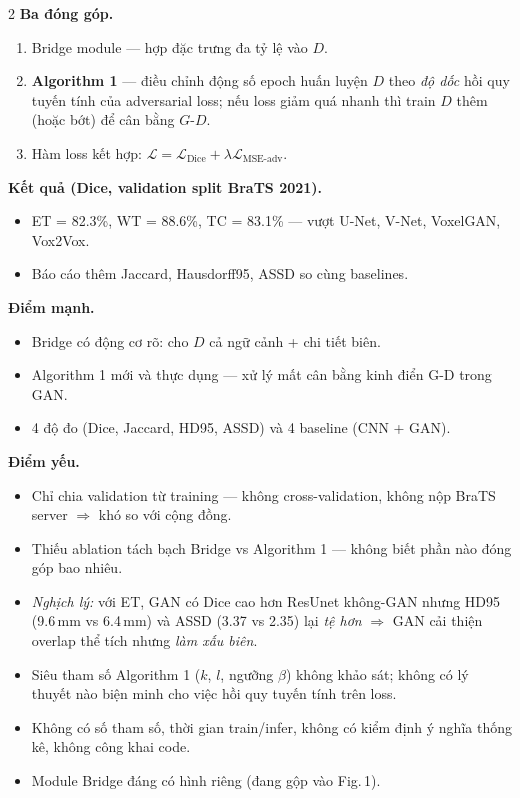 \begin{paracol}{2}
\textbf{Ba đóng góp.}
\begin{enumerate}[leftmargin=*,nosep]
  \item Bridge module — hợp đặc trưng đa tỷ lệ vào $D$.
  \item \textbf{Algorithm 1} — điều chỉnh động số epoch huấn luyện $D$ theo \emph{độ dốc} hồi quy tuyến tính của adversarial loss; nếu loss giảm quá nhanh thì train $D$ thêm (hoặc bớt) để cân bằng $G$-$D$.
  \item Hàm loss kết hợp: $\mathcal L=\mathcal L_{\text{Dice}}+\lambda \mathcal L_{\text{MSE-adv}}$.
\end{enumerate}

\textbf{Kết quả (Dice, validation split BraTS 2021).}
\begin{itemize}[leftmargin=*,nosep]
  \item ET = 82.3\%, WT = 88.6\%, TC = 83.1\% — vượt U-Net, V-Net, VoxelGAN, Vox2Vox.
  \item Báo cáo thêm Jaccard, Hausdorff95, ASSD so cùng baselines.
\end{itemize}

\textbf{Điểm mạnh.}
\begin{itemize}[leftmargin=*,nosep]
  \item Bridge có động cơ rõ: cho $D$ cả ngữ cảnh + chi tiết biên.
  \item Algorithm 1 mới và thực dụng — xử lý mất cân bằng kinh điển G-D trong GAN.
  \item 4 độ đo (Dice, Jaccard, HD95, ASSD) và 4 baseline (CNN + GAN).
\end{itemize}

\textbf{Điểm yếu.}
\begin{itemize}[leftmargin=*,nosep]
  \item Chỉ chia validation từ training — không cross-validation, không nộp BraTS server $\Rightarrow$ khó so với cộng đồng.
  \item Thiếu ablation tách bạch Bridge vs Algorithm 1 — không biết phần nào đóng góp bao nhiêu.
  \item \emph{Nghịch lý:} với ET, GAN có Dice cao hơn ResUnet không-GAN nhưng HD95 (9.6\,mm vs 6.4\,mm) và ASSD (3.37 vs 2.35) lại \emph{tệ hơn} $\Rightarrow$ GAN cải thiện overlap thể tích nhưng \emph{làm xấu biên}.
  \item Siêu tham số Algorithm 1 ($k$, $l$, ngưỡng $\beta$) không khảo sát; không có lý thuyết nào biện minh cho việc hồi quy tuyến tính trên loss.
  \item Không có số tham số, thời gian train/infer, không có kiểm định ý nghĩa thống kê, không công khai code.
  \item Module Bridge đáng có hình riêng (đang gộp vào Fig.\,1).
\end{itemize}


\end{paracol}
